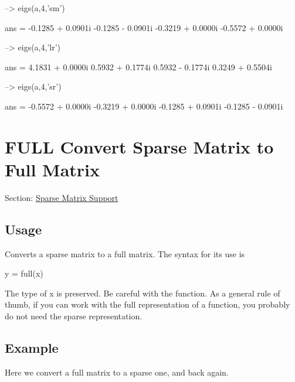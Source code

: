 \begin{DoxyVerbInclude}
--> eigs(a,4,'sm')

ans = 
  -0.1285 +  0.0901i 
  -0.1285 -  0.0901i 
  -0.3219 +  0.0000i 
  -0.5572 +  0.0000i 

--> eigs(a,4,'lr')

ans = 
   4.1831 +  0.0000i 
   0.5932 +  0.1774i 
   0.5932 -  0.1774i 
   0.3249 +  0.5504i 

--> eigs(a,4,'sr')

ans = 
  -0.5572 +  0.0000i 
  -0.3219 +  0.0000i 
  -0.1285 +  0.0901i 
  -0.1285 -  0.0901i 
\end{DoxyVerbInclude}
 \hypertarget{sparse_full}{}\section{F\-U\-L\-L Convert Sparse Matrix to Full Matrix}\label{sparse_full}
Section\-: \hyperlink{sec_sparse}{Sparse Matrix Support} \hypertarget{vtkwidgets_vtkxyplotwidget_Usage}{}\subsection{Usage}\label{vtkwidgets_vtkxyplotwidget_Usage}
Converts a sparse matrix to a full matrix. The syntax for its use is \begin{DoxyVerb}   y = full(x)
\end{DoxyVerb}
 The type of {\ttfamily x} is preserved. Be careful with the function. As a general rule of thumb, if you can work with the {\ttfamily full} representation of a function, you probably do not need the sparse representation. \hypertarget{variables_struct_Example}{}\subsection{Example}\label{variables_struct_Example}
Here we convert a full matrix to a sparse one, and back again.


